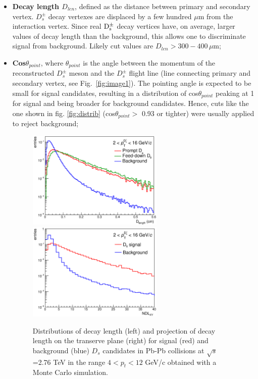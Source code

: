 \begin{itemize}
\item \textbf{Decay length $D_{len}$}, defined as the distance between
 primary and secondary vertex. $D^{\pm}_s$ decay vertexes are displaced by
  a few hundred $\mu$m from the interaction vertex. Since real ${\rm D^{\pm}_s}$ 
  decay vertices have, on average, larger values of decay length than the
   background, this allows one to discriminate signal from background. 
   Likely cut values are $D_{len} > 300-400\, \mu $m;
\item \textbf{Cos$\theta_{point}$}, where $\theta_{point}$ is the angle
 between the momentum of the reconstructed $D^{\pm}_s$ meson and the 
 $D^{\pm}_s$ flight line (line connecting primary and secondary vertex, see
  Fig.~\ref{fig:image1}). The pointing angle is expected to be small for signal 
  candidates, resulting in a distribution of cos$\theta_{point}$ peaking at 1 for 
  signal and being broader for background candidates. Hence, cuts like the 
  one shown in fig. \ref{fig:distrib} (cos$\theta_{point} >$ 0.93 or tighter) 
  were usually applied to reject background;
\begin{figure}[!t]
\includegraphics[width=6.5cm]{FigCap4/DL.eps}
\includegraphics[width=6.5cm]{FigCap4/NDLxy.eps}
\caption{Distributions of decay length (left) and projection of decay length on the transerve plane (right) for signal (red) and background (blue) $D_s$ candidates in Pb-Pb collisions at $\sqrt{s}$=2.76 TeV in the range $4< p_t <12$ GeV/c obtained with a Monte Carlo simulation.}
\label{fig:DL}
\end{figure}


\end{itemize}
